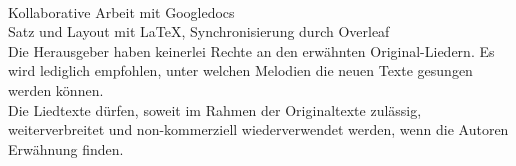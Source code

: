 \documentclass[11pt,a5paper]{article}
\begin{document}
	\ \\
	
	Kollaborative Arbeit mit Googledocs \\
	Satz und Layout mit \LaTeX , Synchronisierung durch Overleaf \\
	
	Die Herausgeber haben keinerlei Rechte an den erwähnten Original-Liedern. Es wird lediglich empfohlen, unter welchen Melodien die neuen Texte gesungen werden können. \\
	
	Die Liedtexte dürfen, soweit im Rahmen der Originaltexte zulässig, weiterverbreitet und non-kommerziell wiederverwendet werden, wenn die Autoren Erwähnung finden.
	
\end{document}
